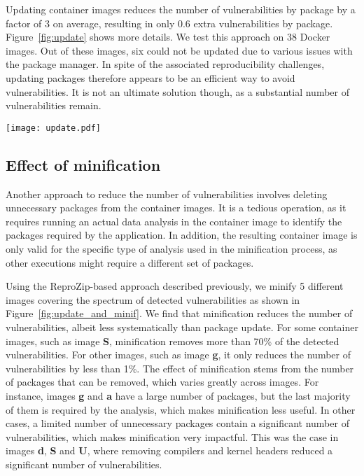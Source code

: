 Updating container images reduces the number of vulnerabilities by package
by a factor of 3 on average, resulting in only 0.6 extra vulnerabilities by
package. Figure~\ref{fig:update} shows more details.
We test this approach on 38 Docker images.
Out of these images, six could not be updated due to various issues with the package
manager.
In spite of the associated reproducibility challenges, updating
packages therefore appears to be an efficient way to avoid vulnerabilities. It
is not an ultimate solution though, as a substantial number of
vulnerabilities remain.

\begin{center}
\texttt{[image: update.pdf]}
\label{fig:update}
\end{center}

\subsection{Effect of minification}

Another approach to reduce the number of vulnerabilities involves deleting
unnecessary packages from the container images. It is a tedious operation,
as it requires running an actual data analysis in the container image to
identify the packages required by the application. In addition, the
resulting container image is only valid for the specific type of analysis
used in the minification process, as other executions might require a
different set of packages.

Using the ReproZip-based approach described previously, we minify 5
different images covering the spectrum of detected vulnerabilities
as shown in Figure~\ref{fig:update_and_minif}. We find that minification reduces the
number of vulnerabilities, albeit less systematically than package update.
For some container images, such as image \textbf{S}, minification removes more
than 70\% of the detected vulnerabilities. For other images, such as
image \textbf{g}, it only reduces the number of vulnerabilities by less than 1\%.
The effect of minification stems from the number of packages
that can be removed, which varies greatly across images. For
instance, images \textbf{g} and \textbf{a} have a large number of packages,
but the last majority of them is required by the analysis, which makes
minification less useful. In other cases, a limited number of unnecessary packages contain
a significant number of vulnerabilities, which makes minification very impactful.
This was the case in images \textbf{d}, \textbf{S} and \textbf{U}, where removing compilers
and kernel headers reduced a significant number of vulnerabilities.

